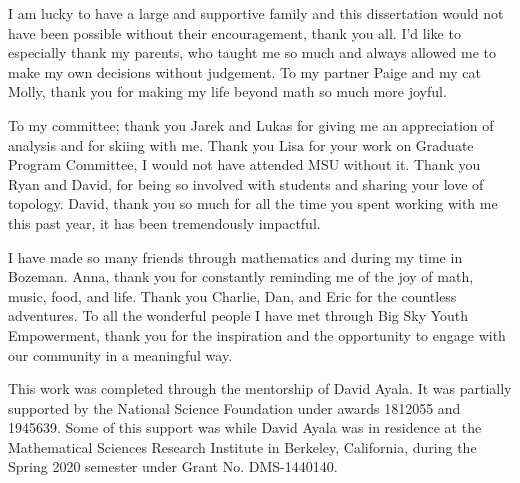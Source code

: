 


I am lucky to have a large and supportive family and this dissertation would not have been possible without their encouragement, thank you all. I'd like to especially thank my parents, who taught me so much and always allowed me to make my own decisions without judgement. To my partner Paige and my cat Molly, thank you for making my life beyond math so much more joyful.  

To my committee; thank you Jarek and Lukas for giving me an appreciation of analysis and for skiing with me. Thank you Lisa for your work on Graduate Program Committee, I would not have attended MSU without it. Thank you Ryan and David, for being so involved with students and sharing your love of topology. David, thank you so much for all the time you spent working with me this past year, it has been tremendously impactful. 

I have made so many friends through mathematics and during my time in Bozeman. Anna, thank you for constantly reminding me of the joy of math, music, food, and life. Thank you Charlie, Dan, and Eric for the countless adventures. To all the wonderful people I have met through Big Sky Youth Empowerment, thank you for the inspiration and the opportunity to engage with our community in a meaningful way.

This work was completed through the mentorship of David Ayala.
It was partially supported by the National Science Foundation under awards 1812055 and 1945639.  
Some of this support was while David Ayala was in residence at the Mathematical Sciences Research Institute in Berkeley, California, during the Spring 2020 semester under Grant No. DMS-1440140.




